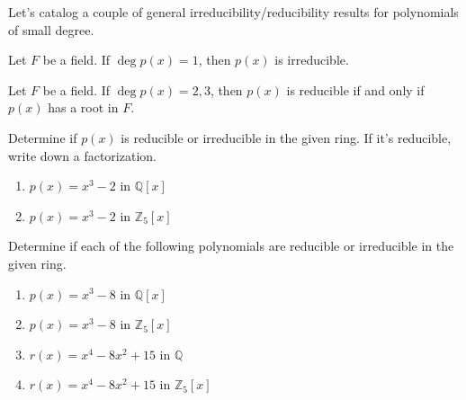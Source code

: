 Let's catalog a couple of general irreducibility/reducibility results for polynomials of small degree.

\begin{theorem}
Let $F$ be a field. If $\deg p(x) = 1$, then $p(x)$ is irreducible.
\end{theorem}

\begin{theorem}\label{thm.ReducibilityTestDegree2or3}
Let $F$ be a field. If $\deg p(x) = 2,3$, then $p(x)$ is reducible if and only if $p(x)$ has a root in $F$.
\end{theorem}

\begin{problem}
Determine if $p(x)$ is reducible or irreducible in the given ring. If it's reducible, write down a factorization.
\begin{enumerate}
\item $p(x) = x^3-2$ in $\mathbb{Q}[x]$
\item $p(x) = x^3-2$ in $\mathbb{Z}_5[x]$
\end{enumerate}
\end{problem}

\begin{problem}
Determine if each of the following polynomials are reducible or irreducible in the given ring.
\begin{multicols}{2}
\begin{enumerate}
\item $p(x) = x^3-8$ in $\mathbb{Q}[x]$
\item $p(x) = x^3-8$ in $\mathbb{Z}_5[x]$
\item $r(x) = x^4-8x^2+15$ in $\mathbb{Q}$
\item $r(x) = x^4-8x^2+15$ in $\mathbb{Z}_5[x]$
\end{enumerate}
\end{multicols}
\end{problem}






